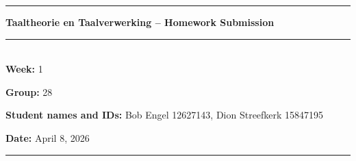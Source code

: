 \documentclass[11pt]{article}
\begin{document}

\rule{\textwidth}{1pt}
\begin{center}
  \textbf{Taaltheorie en Taalverwerking -- Homework Submission}
\end{center}
\rule{\textwidth}{0.5pt}\\


\textbf{Week:} 1

\textbf{Group:} 28

\textbf{Student names and IDs:} Bob Engel 12627143, Dion Streefkerk 15847195

\textbf{Date:} April 8, 2026

\rule{\textwidth}{1pt}

\end{document}
